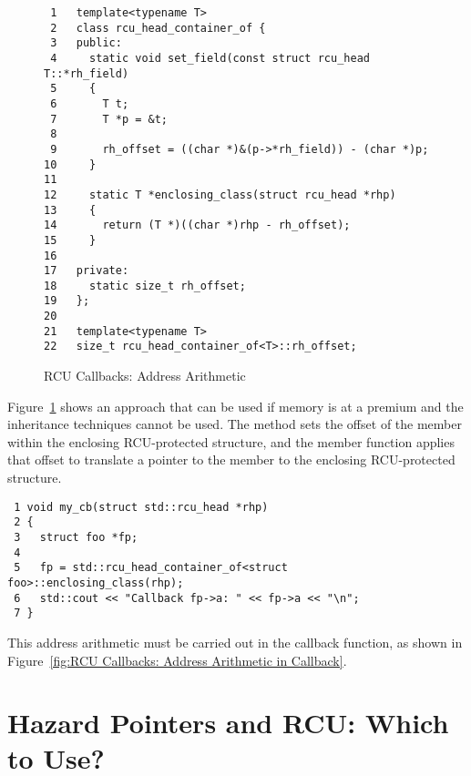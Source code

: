 \documentclass[letterpaper,twocolumn,10pt]{article}
\begin{document}
\begin{figure}[tbp]
{ \scriptsize
\begin{verbatim}
 1   template<typename T>
 2   class rcu_head_container_of {
 3   public:
 4     static void set_field(const struct rcu_head T::*rh_field)
 5     {
 6       T t;
 7       T *p = &t;
 8
 9       rh_offset = ((char *)&(p->*rh_field)) - (char *)p;
10     }
11
12     static T *enclosing_class(struct rcu_head *rhp)
13     {
14       return (T *)((char *)rhp - rh_offset);
15     }
16
17   private:
18     static size_t rh_offset;
19   };
20
21   template<typename T>
22   size_t rcu_head_container_of<T>::rh_offset;
\end{verbatim}
}
\caption{RCU Callbacks: Address Arithmetic}
\label{fig:RCU Callbacks: Address Arithmetic}
\end{figure}

Figure~\ref{fig:RCU Callbacks: Address Arithmetic}
shows an approach that can be used if memory is at a premium and
the inheritance techniques cannot be used.
The  method sets the offset of the
 member within the enclosing RCU-protected
structure, and the  member function
applies that offset to translate a pointer to the
 member to the enclosing RCU-protected structure.

\begin{figure*}[tbp]
{ \scriptsize
\begin{verbatim}
 1 void my_cb(struct std::rcu_head *rhp)
 2 {
 3   struct foo *fp;
 4
 5   fp = std::rcu_head_container_of<struct foo>::enclosing_class(rhp);
 6   std::cout << "Callback fp->a: " << fp->a << "\n";
 7 }
\end{verbatim}
}
\caption{RCU Callbacks: Address Arithmetic in Callback}
\label{fig:RCU Callbacks: Address Arithmetic in Callback}
\end{figure*}

This address arithmetic must be carried out in the callback function,
as shown in
Figure~\ref{fig:RCU Callbacks: Address Arithmetic in Callback}.

\section{Hazard Pointers and RCU: Which to Use?}
\label{sec:Hazard Pointers and RCU: Which to Use?}
\end{document}
